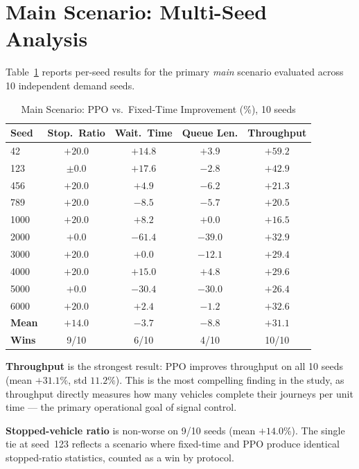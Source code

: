 \documentclass[12pt,oneside,a4paper]{report}
\newcommand{\ppo}{\textsc{PPO}}
\begin{document}
\section{Main Scenario: Multi-Seed Analysis}
\label{sec:res_main}

Table~\ref{tab:main_results} reports per-seed results for the
primary \textit{main} scenario evaluated across 10 independent
demand seeds.

\begin{table}[H]
\centering
\caption{Main Scenario: PPO vs.\ Fixed-Time Improvement (\%), 10 seeds}
\label{tab:main_results}
\begin{tabular}{lcccc}
\toprule
\textbf{Seed} & \textbf{Stop.\ Ratio} & \textbf{Wait.\ Time} &
  \textbf{Queue Len.} & \textbf{Throughput}\\
\midrule
42   & $+20.0$ & $+14.8$ & $+3.9$  & $+59.2$ \\
123  & $\pm0.0$ & $+17.6$ & $-2.8$  & $+42.9$ \\
456  & $+20.0$ & $+4.9$  & $-6.2$  & $+21.3$ \\
789  & $+20.0$ & $-8.5$  & $-5.7$  & $+20.5$ \\
1000 & $+20.0$ & $+8.2$  & $+0.0$  & $+16.5$ \\
2000 & $+0.0$  & $-61.4$ & $-39.0$ & $+32.9$ \\
3000 & $+20.0$ & $+0.0$  & $-12.1$ & $+29.4$ \\
4000 & $+20.0$ & $+15.0$ & $+4.8$  & $+29.6$ \\
5000 & $+0.0$  & $-30.4$ & $-30.0$ & $+26.4$ \\
6000 & $+20.0$ & $+2.4$  & $-1.2$  & $+32.6$ \\
\midrule
\textbf{Mean} & $+14.0$ & $-3.7$ & $-8.8$ & $+31.1$ \\
\textbf{Wins} & 9/10    & 6/10  & 4/10   & 10/10   \\
\bottomrule
\end{tabular}
\end{table}

\textbf{Throughput} is the strongest result: \ppo{} improves
throughput on all 10 seeds (mean $+31.1\%$, std $11.2\%$).
This is the most compelling finding in the study, as throughput
directly measures how many vehicles complete their journeys per
unit time --- the primary operational goal of signal control.

\textbf{Stopped-vehicle ratio} is non-worse on 9/10 seeds
(mean $+14.0\%$).  The single tie at seed~123 reflects a
scenario where fixed-time and \ppo{} produce identical
stopped-ratio statistics, counted as a win by protocol.
\end{document}
